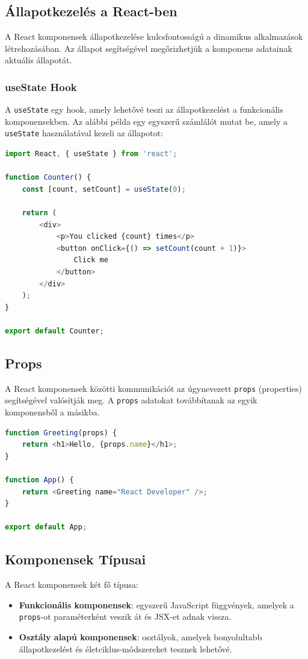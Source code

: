 \documentclass[colorlinks]{thesis-kando}
\theoremstyle{definition}
\theoremstyle{remark}
\begin{document}
\subsection{Állapotkezelés a React-ben}
A React komponensek állapotkezelése kulcsfontosságú a dinamikus alkalmazások létrehozásában. Az állapot segítségével megőrizhetjük a komponens adatainak aktuális állapotát.

\subsubsection{useState Hook}
A \texttt{useState} egy hook, amely lehetővé teszi az állapotkezelést a funkcionális komponensekben. Az alábbi példa egy egyszerű számlálót mutat be, amely a \texttt{useState} használatával kezeli az állapotot:

\begin{lstlisting}[language=JavaScript]
import React, { useState } from 'react';

function Counter() {
    const [count, setCount] = useState(0);

    return (
        <div>
            <p>You clicked {count} times</p>
            <button onClick={() => setCount(count + 1)}>
                Click me
            </button>
        </div>
    );
}

export default Counter;
\end{lstlisting}

\subsection{Props}
A React komponensek közötti kommunikációt az úgynevezett \texttt{props} (properties) segítségével valósítják meg. A \texttt{props} adatokat továbbítanak az egyik komponensből a másikba.

\begin{lstlisting}[language = JavaScript]
function Greeting(props) {
    return <h1>Hello, {props.name}</h1>;
}

function App() {
    return <Greeting name="React Developer" />;
}

export default App;
\end{lstlisting}

\subsection{Komponensek Típusai}
A React komponensek két fő típusa:
\begin{itemize}
    \item \textbf{Funkcionális komponensek}: egyszerű JavaScript függvények, amelyek a \texttt{props}-ot paraméterként veszik át és JSX-et adnak vissza.
    \item \textbf{Osztály alapú komponensek}: osztályok, amelyek bonyolultabb állapotkezelést és életciklus-módszereket tesznek lehetővé.
\end{itemize}
\end{document}
